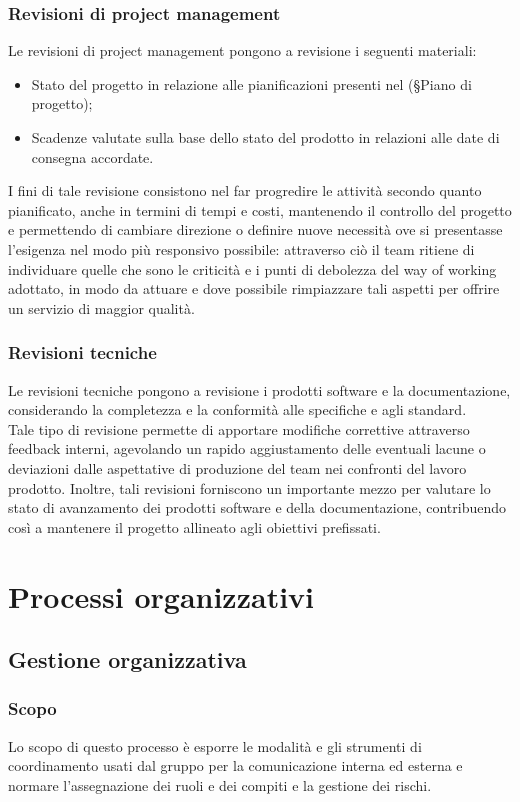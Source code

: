 \documentclass[10pt, a4paper]{article}
\begin{document}
\subsubsection{Revisioni di project management}
Le revisioni di project management pongono a revisione i seguenti materiali:
\begin{itemize}
    \item Stato del progetto in relazione alle pianificazioni presenti nel (\S Piano di progetto);
    \item Scadenze valutate sulla base dello stato del prodotto in relazioni alle date di consegna accordate.
\end{itemize}
I fini di tale revisione consistono nel far progredire le attività secondo quanto pianificato, anche in termini di tempi e costi, mantenendo il controllo del progetto e 
permettendo di cambiare direzione o definire nuove necessità ove si presentasse l'esigenza nel modo più responsivo possibile: attraverso ciò il team
ritiene di individuare quelle che sono le criticità e i punti di debolezza del way of working adottato, in modo da attuare e dove possibile rimpiazzare
tali aspetti per offrire un servizio di maggior qualità.

\subsubsection{Revisioni tecniche}
Le revisioni tecniche pongono a revisione i prodotti software e la documentazione, considerando la completezza e la conformità alle specifiche e agli standard.\\
Tale tipo di revisione permette di apportare modifiche correttive attraverso feedback interni, agevolando un rapido aggiustamento delle eventuali lacune o deviazioni
dalle aspettative di produzione del team nei confronti del lavoro prodotto. Inoltre, tali revisioni forniscono un importante 
mezzo per valutare lo stato di avanzamento dei prodotti software e della documentazione, contribuendo così a mantenere il progetto allineato agli obiettivi 
prefissati.

\section{Processi organizzativi}

\subsection{Gestione organizzativa}
\subsubsection{Scopo}
Lo scopo di questo processo è esporre le modalità e gli strumenti di coordinamento usati dal gruppo per la comunicazione interna ed esterna e normare l'assegnazione dei ruoli e dei compiti e la gestione dei rischi.
\end{document}

